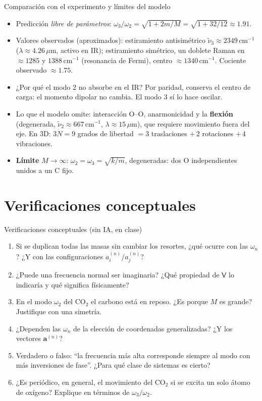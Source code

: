 \documentclass[spanish,10pt]{beamer}
\newcommand{\Vm}{\mathsf{V}}                 %
\newcommand{\av}[1]{\mathbf{a}^{(#1)}}       %
\begin{document}
\begin{frame}{Comparación con el experimento y límites del modelo}
\begin{itemize}[<+->]
  \item Predicción \emph{libre de parámetros}: $\omega_3/\omega_2=\sqrt{1+2m/M}=\sqrt{1+32/12}\approx1.91$.
  \item Valores observados (aproximados): estiramiento antisimétrico $\tilde\nu_3\approx2349\,\mathrm{cm}^{-1}$ ($\lambda\approx4.26\,\mu$m, activo en IR); estiramiento simétrico, un doblete Raman en $\approx1285$ y $1388\,\mathrm{cm}^{-1}$ (resonancia de Fermi), centro $\approx1340\,\mathrm{cm}^{-1}$. Cociente observado $\approx1.75$.
  \item ¿Por qué el modo 2 no absorbe en el IR? Por paridad, conserva el centro de carga: el momento dipolar no cambia. El modo 3 sí lo hace oscilar.
  \item Lo que el modelo omite: interacción O--O, anarmonicidad y la \textbf{flexión} (degenerada, $\tilde\nu_2\approx667\,\mathrm{cm}^{-1}$, $\lambda\approx15\,\mu$m), que requiere movimiento fuera del eje. En 3D: $3N=9$ grados de libertad $=3$ traslaciones $+\,2$ rotaciones $+\,4$ vibraciones.
  \item \textbf{Límite} $M\to\infty$: $\omega_2=\omega_3=\sqrt{k/m}$, degeneradas: dos O independientes unidos a un C fijo.
\end{itemize}
\end{frame}

\section{Verificaciones conceptuales}
\begin{frame}{Verificaciones conceptuales (sin IA, en clase)}
\begin{enumerate}
  \item Si se duplican todas las masas sin cambiar los resortes, ¿qué ocurre con las $\omega_n$? ¿Y con las configuraciones $a_i^{(n)}/a_j^{(n)}$?
  \item ¿Puede una frecuencia normal ser imaginaria? ¿Qué propiedad de $\Vm$ lo indicaría y qué significa físicamente?
  \item En el modo $\omega_2$ del CO$_2$ el carbono está en reposo. ¿Es porque $M$ es grande? Justifique con una simetría.
  \item ¿Dependen las $\omega_n$ de la elección de coordenadas generalizadas? ¿Y los vectores $\av n$?
  \item Verdadero o falso: “la frecuencia más alta corresponde siempre al modo con más inversiones de fase”. ¿Para qué clase de sistemas es cierto?
  \item ¿Es periódico, en general, el movimiento del CO$_2$ si se excita un solo átomo de oxígeno? Explique en términos de $\omega_3/\omega_2$.
\end{enumerate}
\end{frame}
\end{document}
